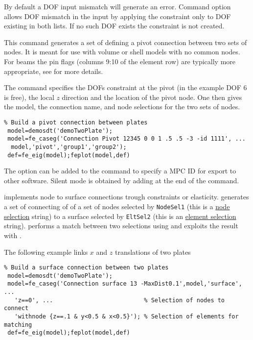 \begin{SDT}
By default a DOF input mismatch will generate an error. Command option  allows DOF mismatch in the input by applying the constraint only to DOF existing in both lists. If no such DOF exists the constraint is not created.


This command generates a set of  defining a pivot connection between two sets of nodes. It is meant for use with volume or shell models with no common nodes. For beams the pin flags (columns 9:10 of the element row) are typically more appropriate, see \beam for more details.

The command specifies the DOFs constraint at the pivot (in the example DOF 6 is free), the local $z$ direction and the location of the pivot node. One then gives the model, the connection name, and node selections for the two sets of nodes. 

\begin{verbatim}
% Build a pivot connection between plates
 model=demosdt('demoTwoPlate');
 model=fe_caseg('Connection Pivot 12345 0 0 1 .5 .5 -3 -id 1111', ...
  model,'pivot','group1','group2');
 def=fe_eig(model);feplot(model,def)
\end{verbatim}%

The option  can be added to the command to specify a MPC ID {\ti {}} for export to other software. Silent mode is obtained by adding \ts{;} at the end of the command.


 implements node to surface connections trough constraints or elasticity.  generates a set of  connecting of  of a set of nodes selected by {\tt NodeSel1} (this is a \hyperlink{findnode}{node selection} string) to a surface selected by {\tt EltSel2} (this is an \hyperlink{findelt}{element selection} string).  performs a match between two selections using  and exploits the result with .

The following example links $x$ and $z$ translations of two plates

\begin{verbatim}
% Build a surface connection between two plates
 model=demosdt('demoTwoPlate');
 model=fe_caseg('Connection surface 13 -MaxDist0.1',model,'surface', ...
   'z==0', ...                          % Selection of nodes to connect
   'withnode {z==.1 & y<0.5 & x<0.5}'); % Selection of elements for matching
 def=fe_eig(model);feplot(model,def)
\end{verbatim}%



\end{SDT}
